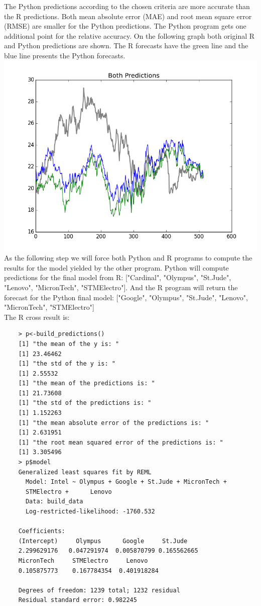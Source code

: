 \documentclass[
  twoside,
  11pt, a4paper,
  footinclude=true,
  headinclude=true,
  cleardoublepage=empty
]{scrreprt}
\begin{document}
    The Python predictions according to the chosen criteria are more accurate than the R predictions. Both mean absolute error (MAE) and root mean square error (RMSE) are smaller for the Python predictions. The Python program gets one additional point for the relative accuracy. On the following graph both original R and Python predictions are shown. The R forecasts have the green line and the blue line presents the Python forecasts.\\
    \includegraphics[scale=0.75]{BothPredictions.png}\\
    As the following step we will force both Python and R programs to compute the results for the model yielded by the other program. Python will compute predictions for the final model from R: ["Cardinal", "Olympus", "St.Jude", "Lenovo", "MicronTech", "STMElectro"]. And the R program will return the forecast for the Python final model: ["Google", "Olympus", "St.Jude", "Lenovo", "MicronTech", "STMElectro"]\\
    The R cross result is:
    \begin{verbatim}
    > p<-build_predictions()
    [1] "the mean of the y is: "
    [1] 23.46462
    [1] "the std of the y is: "
    [1] 2.55532
    [1] "the mean of the predictions is: "
    [1] 21.73608
    [1] "the std of the predictions is: "
    [1] 1.152263
    [1] "the mean absolute error of the predictions is: "
    [1] 2.631951
    [1] "the root mean squared error of the predictions is: "
    [1] 3.305496
    > p$model
    Generalized least squares fit by REML
      Model: Intel ~ Olympus + Google + St.Jude + MicronTech + 
      STMElectro +      Lenovo 
      Data: build_data 
      Log-restricted-likelihood: -1760.532
    
    Coefficients:
    (Intercept)     Olympus      Google     St.Jude  
    2.299629176   0.047291974  0.005870799 0.165562665
    MicronTech     STMElectro     Lenovo 
    0.105875773    0.167784354  0.401918284 
    
    Degrees of freedom: 1239 total; 1232 residual
    Residual standard error: 0.982245 
    \end{verbatim}
\end{document}
